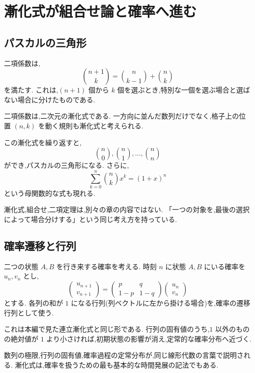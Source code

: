 
\section{漸化式が組合せ論と確率へ進む}

\subsection{パスカルの三角形}

二項係数は,
\[
  \binom{n+1}{k}
  =
  \binom{n}{k-1}+\binom{n}{k}
\]
を満たす.
これは,$(n+1)$ 個から $k$ 個を選ぶとき,特別な一個を選ぶ場合と選ばない場合に分けたものである.

二項係数は,二次元の漸化式である.
一方向に並んだ数列だけでなく,格子上の位置 $(n,k)$ を動く規則も漸化式と考えられる.

この漸化式を繰り返すと,
\[
  \binom{n}{0},\binom{n}{1},\ldots,\binom{n}{n}
\]
ができ,パスカルの三角形になる.
さらに,
\[
  \sum_{k=0}^{n}\binom{n}{k}x^k=(1+x)^n
\]
という母関数的な式も現れる.

漸化式,組合せ,二項定理は,別々の章の内容ではない.
「一つの対象を,最後の選択によって場合分けする」という同じ考え方を持っている.

\subsection{確率遷移と行列}

二つの状態 $A,B$ を行き来する確率を考える.
時刻 $n$ に状態 $A,B$ にいる確率を $u_n,v_n$ とし,
\[
  \begin{pmatrix}u_{n+1}\\v_{n+1}\end{pmatrix}
  =
  \begin{pmatrix}p&q\\1-p&1-q\end{pmatrix}
  \begin{pmatrix}u_n\\v_n\end{pmatrix}
\]
とする.
各列の和が $1$ になる行列(列ベクトルに左から掛ける場合)を,確率の遷移行列として使う.

これは本編で見た連立漸化式と同じ形である.
行列の固有値のうち,$1$ 以外のものの絶対値が $1$ より小さければ,初期状態の影響が消え,定常的な確率分布へ近づく.

数列の極限,行列の固有値,確率過程の定常分布が,同じ線形代数の言葉で説明される.
漸化式は,確率を扱うための最も基本的な時間発展の記法でもある.

